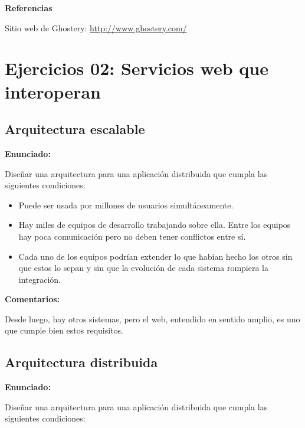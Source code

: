\textbf{Referencias}

Sitio web de Ghostery: \url{http://www.ghostery.com/}


\section{Ejercicios 02: Servicios web que interoperan}



\subsection{Arquitectura escalable}
\label{subsec:arq-escalable}

\textbf{Enunciado:}

Diseñar una arquitectura para una aplicación distribuida que cumpla las siguientes condiciones:

\begin{itemize}
\item Puede ser usada por millones de usuarios simultáneamente.
\item Hay miles de equipos de desarrollo trabajando sobre ella. Entre los equipos hay poca comunicación pero no deben tener conflictos entre sí.
\item Cada uno de los equipos podrían extender lo que habían hecho los otros sin que estos lo sepan y sin que la evolución de cada sistema rompiera la integración.
\end{itemize}

\textbf{Comentarios:}

Desde luego, hay otros sistemas, pero el web, entendido en sentido amplio, es uno que cumple bien estos requisitos.


\subsection{Arquitectura distribuida}
\label{subsec:arq-distribuida}

\textbf{Enunciado:}

Diseñar una arquitectura para una aplicación distribuida que cumpla las siguientes condiciones:

